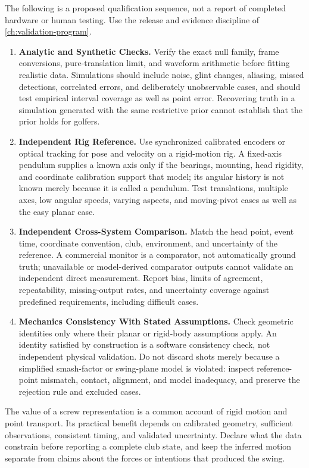 The following is a proposed qualification sequence, not a report of completed hardware or human testing.
Use the release and evidence discipline of \cref{ch:validation-program}.
\begin{enumerate}
\item \textbf{Analytic and Synthetic Checks.}
Verify the exact null family, frame conversions, pure-translation limit, and waveform arithmetic before fitting realistic data.
Simulations should include noise, glint changes, aliasing, missed detections, correlated errors, and deliberately unobservable cases, and should test empirical interval coverage as well as point error.
Recovering truth in a simulation generated with the same restrictive prior cannot establish that the prior holds for golfers.
\item \textbf{Independent Rig Reference.}
Use synchronized calibrated encoders or optical tracking for pose and velocity on a rigid-motion rig.
A fixed-axis pendulum supplies a known axis only if the bearings, mounting, head rigidity, and coordinate calibration support that model; its angular history is not known merely because it is called a pendulum.
Test translations, multiple axes, low angular speeds, varying aspects, and moving-pivot cases as well as the easy planar case.
\item \textbf{Independent Cross-System Comparison.}
Match the head point, event time, coordinate convention, club, environment, and uncertainty of the reference.
A commercial monitor is a comparator, not automatically ground truth; unavailable or model-derived comparator outputs cannot validate an independent direct measurement.
Report bias, limits of agreement, repeatability, missing-output rates, and uncertainty coverage against predefined requirements, including difficult cases.
\item \textbf{Mechanics Consistency With Stated Assumptions.}
Check geometric identities only where their planar or rigid-body assumptions apply.
An identity satisfied by construction is a software consistency check, not independent physical validation.
Do not discard shots merely because a simplified smash-factor or swing-plane model is violated: inspect reference-point mismatch, contact, alignment, and model inadequacy, and preserve the rejection rule and excluded cases.
\end{enumerate}

\begin{implication}
The value of a screw representation is a common account of rigid motion and point transport.
Its practical benefit depends on calibrated geometry, sufficient observations, consistent timing, and validated uncertainty.
Declare what the data constrain before reporting a complete club state, and keep the inferred motion separate from claims about the forces or intentions that produced the swing.
\end{implication}
